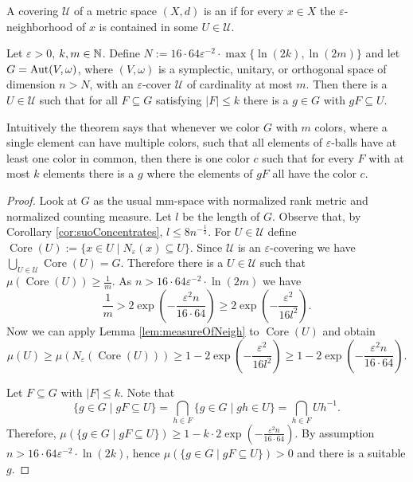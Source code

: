 A covering $\mathcal{U}$ of a metric space $(X,d)$ is an  if for every $x\in X$ the $\varepsilon$-neighborhood of $x$ is contained in some $U\in\mathcal{U}$.

\begin{theorem}
Let $\varepsilon>0$, $k,m\in\mathbb{N}$. Define $N:=16\cdot64\varepsilon^{-2}\cdot\max\{\ln(2k),\ln(2m)\}$ and let $G=\operatorname{Aut}(V,\omega)$, where $(V,\omega)$ is a symplectic, unitary, or orthogonal space of dimension $n>N$, with an $\varepsilon$-cover $\mathcal{U}$ of cardinality at most $m$. Then there is a $U\in\mathcal{U}$ such that for all $F\subseteq G$ satisfying $|F|\leq k$ there is a $g\in G$ with $gF\subseteq U$.
\end{theorem}
Intuitively the theorem says that whenever we color $G$ with $m$ colors, where a single element can have multiple colors, such that all elements of $\varepsilon$-balls have at least one color in common, then there is one color $c$ such that for every $F$ with at most $k$ elements there is a $g$ where the elements of $gF$ all have the color $c$.
\begin{proof}
\def\core{\operatorname{Core}}
Look at $G$ as the usual mm-space with normalized rank metric and normalized counting measure.
Let $l$ be the length of $G$. Observe that, by Corollary \ref{cor:suoConcentrates}, $l\leq 8n^{-\frac{1}{2}}$.
For $U\in \mathcal{U}$ define $\core(U):=\{x\in U\mid N_\varepsilon(x)\subseteq U\}$. Since $\mathcal{U}$ is an $\varepsilon$-covering we have $\bigcup_{U\in\mathcal{U}}\core(U)=G$. Therefore there is a $U\in\mathcal{U}$ such that $\mu(\core(U))\geq\frac{1}{m}$. As $n>16\cdot64\varepsilon^{-2}\cdot\ln(2m)$ we have
\[\frac{1}{m}>2\exp\left(-\frac{\varepsilon^2n}{16\cdot64}\right)\geq 2\exp\left(-\frac{\varepsilon^2}{ 16l^2}\right).\]
Now we can apply Lemma \ref{lem:measureOfNeigh} to $\core(U)$ and obtain
\[\mu(U)\geq\mu(N_\varepsilon(\core(U)))\geq 1-2\exp\left(-\frac{\varepsilon^2}{ 16l^2}\right)\geq1-2\exp\left(-\frac{\varepsilon^2n}{16\cdot64}\right). \]

Let $F\subseteq G$ with $|F|\leq k$. Note that 
\[\{g\in G\mid gF\subseteq U\}=\bigcap_{h\in F}\{g\in G\mid gh\in U\}=\bigcap_{h\in F}Uh^{-1}.\]
Therefore, $\mu(\{g\in G\mid gF\subseteq U\})\geq 1-k\cdot2\exp\left(-\frac{\varepsilon^2n}{16\cdot64}\right)$. By assumption $n>16\cdot64\varepsilon^{-2}\cdot\ln(2k)$, hence $\mu(\{g\in G\mid gF\subseteq U\})>0$ and there is a suitable $g$. 
\end{proof}


